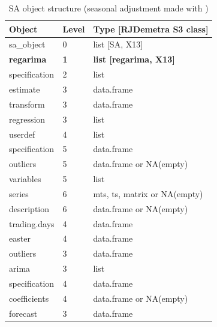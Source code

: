 \documentclass[article]{jss}
\begin{document}
\begin{longtable}{lll}
\caption{\label{tab:obj_tab_x13}SA object structure (seasonal adjustment made with )}\\
\toprule
Object & Level & Type [RJDemetra S3 class]\\
\midrule
sa\_object & 0 & list [SA, X13]\\
\textbf{\hspace{1em}regarima} & \textbf{1} & \textbf{list [regarima, X13]}\\
\hspace{2em}specification & 2 & list\\
\hspace{3em}estimate & 3 & data.frame\\
\hspace{3em}transform & 3 & data.frame\\
\addlinespace
\hspace{3em}regression & 3 & list\\
\hspace{4em}userdef & 4 & list\\
\hspace{5em}specification & 5 & data.frame\\
\hspace{5em}outliers & 5 & data.frame or NA(empty)\\
\hspace{5em}variables & 5 & list\\
\addlinespace
\hspace{6em}series & 6 & mts, ts, matrix or NA(empty)\\
\hspace{6em}description & 6 & data.frame or NA(empty)\\
\hspace{4em}trading.days & 4 & data.frame\\
\hspace{4em}easter & 4 & data.frame\\
\hspace{3em}outliers & 3 & data.frame\\
\addlinespace
\hspace{3em}arima & 3 & list\\
\hspace{4em}specification & 4 & data.frame\\
\hspace{4em}coefficients & 4 & data.frame or NA(empty)\\
\hspace{3em}forecast & 3 & data.frame\\

\end{longtable}
\end{document}

